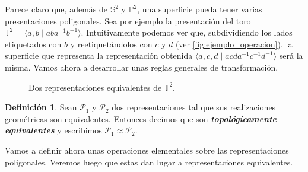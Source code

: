 \documentclass[10pt]{report}
\newcommand{\Esfera}{\mathbb{S}^2}
\newcommand{\Toro}{\mathbb{T}^2}
\newcommand{\Proyectivo}{\mathbb{P}^2}
\newcommand{\enfatiza}[1]{\textbf{\textit{#1}}}
\theoremstyle{definition}
\newtheorem{defin}{Definición}[section]
\begin{document}
Parece claro que, además de $\Esfera$ y $\Proyectivo$, una superficie pueda tener varias presentaciones poligonales. Sea por ejemplo la presentación del toro $\Toro=\langle a,b\mid aba^{-1}b^{-1}\rangle$. Intuitivamente podemos ver que, subdividiendo los lados etiquetados con $b$ y reetiquetándolos con $c$ y $d$ (ver \autoref{fig:ejemplo_operacion}), la superficie que representa la representación obtenida $\langle a,c,d\mid  acda^{-1}c^{-1}d^{-1}\rangle$ será la misma.
Vamos ahora a desarrollar unas reglas generales de transformación.

\begin{figure}%
\centering
{}

\caption{Dos representaciones equivalentes de $\Toro$. \label{fig:ejemplo_operacion}}
\end{figure}

\begin{defin}%
Sean $\mathcal{P}_1$ y $\mathcal{P}_2$ dos representaciones tal que sus realizaciones geométricas son equivalentes. Entonces decimos que son \enfatiza{topológicamente equivalentes} y escribimos $\mathcal{P}_1 \approx \mathcal{P}_2$.
\end{defin}

Vamos a definir ahora unas operaciones elementales sobre las representaciones poligonales. Veremos luego que estas dan lugar a representaciones equivalentes.
\end{document}
